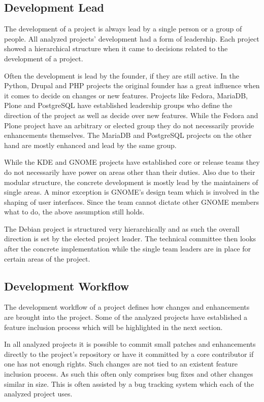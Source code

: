 \subsection{Development Lead} %

The development of a project is always lead by a single person or a group of
people. All analyzed projects' development had a form of leadership. Each
project showed a hierarchical structure when it came to decisions related to
the development of a project.

Often the development is lead by the founder, if they are still active. In the
Python, Drupal and PHP projects the original founder has a great influence when
it comes to decide on changes or new features. Projects like Fedora, MariaDB,
Plone and PostgreSQL have established leadership groups who define the
direction of the project as well as decide over new features. While the Fedora
and Plone project have an arbitrary or elected group they do not necessarily
provide enhancements themselves. The MariaDB and PostgreSQL projects on the
other hand are mostly enhanced and lead by the same group.

While the KDE and GNOME projects have established core or release teams they do
not necessarily have power on areas other than their duties. Also due to their
modular structure, the concrete development is mostly lead by the maintainers
of single areas. A minor exception is GNOME's design team which is involved in
the shaping of user interfaces. Since the team cannot dictate other GNOME
members what to do, the above assumption still holds.

The Debian project is structured very hierarchically and as such the overall
direction is set by the elected project leader. The technical committee then
looks after the concrete implementation while the single team leaders are in
place for certain areas of the project.


\subsection{Development Workflow} %

The development workflow of a project defines how changes and enhancements are
brought into the project. Some of the analyzed projects have established a
feature inclusion process which will be highlighted in the next section.

In all analyzed projects it is possible to commit small patches and
enhancements directly to the project's repository or have it committed by a
core contributor if one has not enough rights. Such changes are not tied to an
existent feature inclusion process. As such this often only comprises bug fixes
and other changes similar in size. This is often assisted by a bug tracking
system which each of the analyzed project uses.

